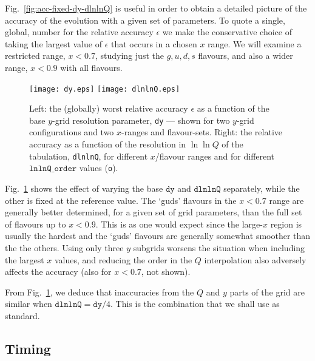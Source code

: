 \documentclass[12pt]{article}
\newcommand{\dy}{\ttt{dy}}
\newcommand{\dlnlnQ}{\ttt{dlnlnQ}}
\newcommand{\ttt}[1]{\texttt{#1}}
\begin{document}
Fig.~\ref{fig:acc-fixed-dy-dlnlnQ} is useful in order to obtain a
detailed picture of the accuracy of the evolution with a given set of
parameters. To quote a single, global, number for the relative 
accuracy $\epsilon$ we make
the conservative choice of taking the largest value of $\epsilon$ that
occurs in a chosen $x$ range. We will examine a restricted range,
$x<0.7$, studying just the $g,u,d,s$ flavours, and also a wider range,
$x<0.9$ with all flavours.

\begin{figure}
  \centering
  \texttt{[image: dy.eps]}%
  \hfill
  \texttt{[image: dlnlnQ.eps]}%
  \caption{Left: the (globally) worst relative accuracy $\epsilon$ as
    a function of the base $y$-grid resolution parameter, \ttt{dy} ---
    shown for two $y$-grid configurations and two $x$-ranges and
    flavour-sets.
  Right: the relative accuracy as a function of the
    resolution in $\ln \ln Q$ of the tabulation, \ttt{dlnlnQ}, for
    different $x$/flavour ranges and for different $\ttt{lnlnQ\_order}$
    values (\ttt{o}).}
  \label{fig:dy+dlnlnQ}
\end{figure}

Fig.~\ref{fig:dy+dlnlnQ} shows the effect of varying the base $\dy$
and $\dlnlnQ$ separately, while the other is fixed at the reference
value. The `guds' flavours in the $x<0.7$ range are generally better
determined, for a given set of grid parameters, than the full set of
flavours up to $x<0.9$. This is as one would expect since the
large-$x$ region is usually the hardest and the `guds' flavours are
generally somewhat smoother than the the others. Using only three $y$
subgrids worsens the situation when including the largest $x$ values,
and reducing the order in the $Q$ interpolation also adversely affects
the accuracy (also for $x<0.7$, not shown).

From Fig.~\ref{fig:dy+dlnlnQ}, we deduce that inaccuracies from the
$Q$ and $y$ parts of the grid are similar when $\dlnlnQ = \dy /4$.
This is the combination that we shall use as standard.


\subsection{Timing}
\label{sec:Timing}
\end{document}
